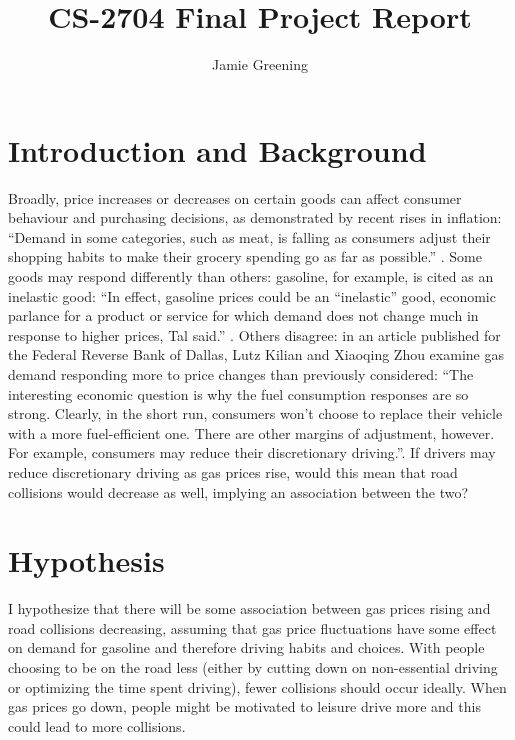 \documentclass[runningheads]{llncs}
\begin{document}
%
\title{CS-2704 Final Project Report}
%
%
\author{Jamie Greening}
%
%
%
\maketitle              %
%

%
%
%
\section{Introduction and Background}
Broadly, price increases or decreases on certain goods can affect consumer behaviour and purchasing decisions, as demonstrated by recent rises in inflation: ``Demand in some categories, such as meat, is falling as consumers adjust their shopping habits to make their grocery spending go as far as possible.'' \cite{ref_art1}. Some goods may respond differently than others: gasoline, for example, is cited as an inelastic good: ``In effect, gasoline prices could be an ``inelastic'' good, economic parlance for a product or service for which demand does not change much in response to higher prices, Tal said.'' \cite{ref_art2}. Others disagree: in an article published for the Federal Reverse Bank of Dallas, Lutz Kilian and Xiaoqing Zhou examine gas demand responding more to price changes than previously considered: ``The interesting economic question is why the fuel consumption responses are so strong. Clearly, in the short run, consumers won’t choose to replace their vehicle with a more fuel-efficient one. There are other margins of adjustment, however. For example, consumers may reduce their discretionary driving.''\cite{ref_art3}. If drivers may reduce discretionary driving as gas prices rise, would this mean that road collisions would decrease as well, implying an association between the two?
\section{Hypothesis}
I hypothesize that there will be some association between gas prices rising and road collisions decreasing, assuming that gas price fluctuations have some effect on demand for gasoline and therefore driving habits and choices. With people choosing to be on the road less (either by cutting down on non-essential driving or optimizing the time spent driving), fewer collisions should occur ideally. When gas prices go down, people might be motivated to leisure drive more and this could lead to more collisions.
\end{document}
